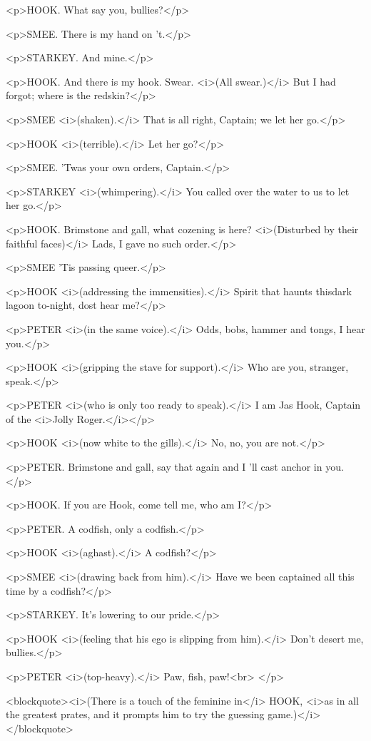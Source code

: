 <p>HOOK. What say you, bullies?</p>

<p>SMEE. There is my hand on 't.</p>

<p>STARKEY. And mine.</p>

<p>HOOK. And there is my hook. Swear. <i>(All swear.)</i> But I had
forgot; where is the redskin?</p>

<p>SMEE <i>(shaken).</i> That is all right, Captain; we let her
go.</p>

<p>HOOK <i>(terrible).</i> Let her go?</p>

<p>SMEE. 'Twas your own orders, Captain.</p>

<p>STARKEY <i>(whimpering).</i> You called over the water to us to
let her go.</p>

<p>HOOK. Brimstone and gall, what cozening is here? <i>(Disturbed by
their faithful faces)</i> Lads, I gave no such order.</p>

<p>SMEE 'Tis passing queer.</p>

<p>HOOK <i>(addressing the immensities).</i> Spirit that haunts
thisdark lagoon to-night, dost hear me?</p>

<p>PETER <i>(in the same voice).</i> Odds, bobs, hammer and tongs, I
hear you.</p>

<p>HOOK <i>(gripping the stave for support).</i> Who are you,
stranger, speak.</p>

<p>PETER <i>(who is only too ready to speak).</i> I am Jas Hook,
Captain of the <i>Jolly Roger.</i></p>

<p>HOOK <i>(now white to the gills).</i> No, no, you are not.</p>

<p>PETER. Brimstone and gall, say that again and I 'll cast anchor in
you.</p>

<p>HOOK. If you are Hook, come tell me, who am I?</p>

<p>PETER. A codfish, only a codfish.</p>

<p>HOOK <i>(aghast).</i> A codfish?</p>

<p>SMEE <i>(drawing back from him).</i> Have we been captained all
this time by a codfish?</p>

<p>STARKEY. It's lowering to our pride.</p>

<p>HOOK <i>(feeling that his ego is slipping from him).</i> Don't
desert me, bullies.</p>

<p>PETER <i>(top-heavy).</i> Paw, fish, paw!<br>
</p>

<blockquote><i>(There is a touch of the feminine in</i> HOOK, <i>as
in all the greatest prates, and it prompts him to try the guessing
game.)</i></blockquote>

